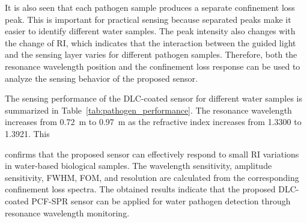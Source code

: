 \documentclass[preprint,12pt]{elsarticle}
\begin{document}
It is also seen that each pathogen sample produces a separate confinement loss peak. This is important for practical sensing because separated peaks make it easier to identify different water samples. The peak intensity also changes with the change of RI, which indicates that the interaction between the guided light and the sensing layer varies for different pathogen samples. Therefore, both the resonance wavelength position and the confinement loss response can be used to analyze the sensing behavior of the proposed sensor.

The sensing performance of the DLC-coated sensor for different water samples is summarized in Table~\ref{tab:pathogen_performance}. The resonance wavelength increases from 0.72~\textmu m to 0.97~\textmu m as the refractive index increases from 1.3300 to 1.3921. This 
\begin{table}[!t]
\centering
\caption{Performance analysis of the proposed DLC-coated sensor for water pathogen detection using pathogen RI values reported in \cite{deepti2025pcf}}
\label{tab:pathogen_performance}
\renewcommand{\arraystretch}{1.15}
\setlength{\tabcolsep}{2.5pt}
\scriptsize
{}
\end{table}
confirms that the proposed sensor can effectively respond to small RI variations in water-based biological samples. The wavelength sensitivity, amplitude sensitivity, FWHM, FOM, and resolution are calculated from the corresponding confinement loss spectra. The obtained results indicate that the proposed DLC-coated PCF-SPR sensor can be applied for water pathogen detection through resonance wavelength monitoring.
\end{document}
